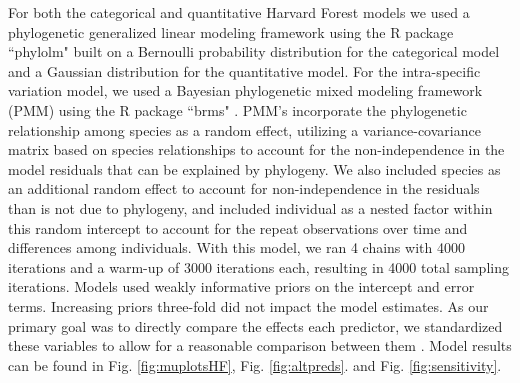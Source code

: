 \documentclass[11pt]{article}
\begin{document}
  \noindent For both the categorical and quantitative Harvard Forest models we used a phylogenetic generalized linear modeling framework \citep{Ives2010} using the R package ``phylolm" \citep{Ho2014} built on a Bernoulli probability distribution for the categorical model and a Gaussian distribution for the quantitative model. For the intra-specific variation model, we used a Bayesian phylogenetic mixed modeling framework (PMM) \citep{Garamszegi2014} using the R package ``brms" \citep{Burkner2018}. PMM's incorporate the phylogenetic relationship among species as a random effect, utilizing a variance-covariance matrix based on species relationships to account for the non-independence in the model residuals that can be explained by phylogeny. We also included species as an additional random effect to account for non-independence in the residuals than is not due to phylogeny, and included individual as a nested factor within this random intercept to account for the repeat observations over time and differences among individuals. With this model, we ran 4 chains with 4000 iterations and a warm-up of 3000 iterations each, resulting in 4000 total sampling iterations. Models used weakly informative priors on the intercept and error terms. Increasing priors three-fold did not impact the model estimates. As our primary goal was to directly compare the effects each predictor, we standardized these variables to allow for a reasonable comparison between them {\citep{Gelman2007}. Model results can be found in Fig. \ref{fig:muplotsHF}, Fig. \ref{fig:altpreds}. and Fig. \ref{fig:sensitivity}.\\
  
}
\end{document}
